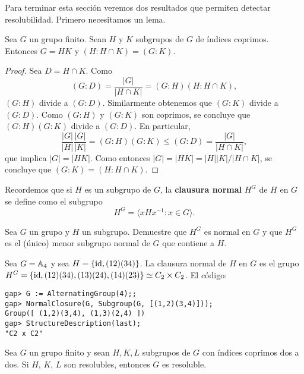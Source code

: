 Para terminar esta sección veremos dos resultados que permiten detectar
resolubilidad. Primero necesitamos un lema.

\begin{lemma}
	\label{lemma:4Wielandt}
	Sea $G$ un grupo finito. Sean $H$ y $K$ subgrupos de $G$ de
	índices coprimos. Entonces $G=HK$ y $(H:H\cap K)=(G:K)$.
\end{lemma}

\begin{proof}
	Sea $D=H\cap K$. Como
	\[
	(G:D)=\frac{|G|}{|H\cap K|}=(G:H)(H:H\cap K),
	\]
	$(G:H)$ divide a $(G:D)$. Similarmente obtenemos que $(G:K)$ divide a
	$(G:D)$. Como $(G:H)$ y $(G:K)$ son coprimos, se concluye que $(G:H)(G:K)$
	divide a $(G:D)$. En particular, 
	\[
	\frac{|G|}{|H|}\frac{|G|}{|K|}=(G:H)(G:K)\leq (G:D)=\frac{|G|}{|H\cap K|},
	\]
	que implica $|G|=|HK|$. Como entonces $|G|=|HK|=|H||K|/|H\cap K|$, se
	concluye que $(G:K)=(H:H\cap K)$.
\end{proof}

Recordemos que si $H$ es un subgrupo de $G$, la
\textbf{clausura normal} $H^G$ de $H$ en $G$ se define como el subgrupo
\[
	H^G=\langle xHx^{-1}:x\in G\rangle.
\]

\begin{exercise}
	Sea $G$ un grupo y $H$ un subgrupo.  Demuestre que $H^G$ es normal en $G$ y
	que $H^G$ es el (único) menor subgrupo normal de $G$ que contiene a $H$.
\end{exercise}


\begin{example}
	Sea $G=\mathbb{A}_4$ y sea $H=\{\operatorname{id},(12)(34)\}$. La clausura normal de $H$ en $G$
	es el grupo $H^G=\{\operatorname{id},(12)(34),(13)(24),(14)(23)\}\simeq C_2\times C_2$. El
	código:
	\begin{lstlisting}
gap> G := AlternatingGroup(4);;
gap> NormalClosure(G, Subgroup(G, [(1,2)(3,4)]));
Group([ (1,2)(3,4), (1,3)(2,4) ])
gap> StructureDescription(last);
"C2 x C2"
	\end{lstlisting}
\end{example}

\begin{theorem}[Wielandt]
	\label{theorem:Wielandt:solvable}
	Sea $G$ un grupo finito y sean $H,K,L$ subgrupos de $G$ con índices
	coprimos dos a dos. Si $H$, $K$, $L$ son resolubles, entonces $G$ es
	resoluble.
\end{theorem}

